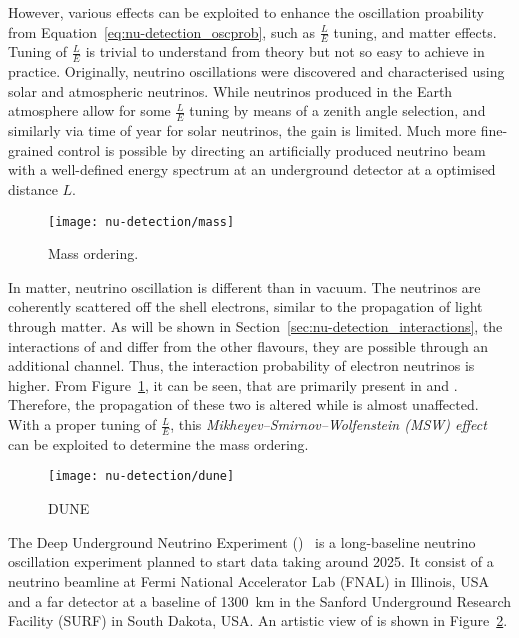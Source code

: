 However, various effects can be exploited to enhance the oscillation proability from Equation~\eqref{eq:nu-detection_oscprob}, such as $\frac{L}{E}$ tuning, and matter effects.
Tuning of $\frac{L}{E}$ is trivial to understand from theory but not so easy to achieve in practice.
Originally, neutrino oscillations were discovered and characterised using solar and atmospheric neutrinos.
While neutrinos produced in the Earth atmosphere allow for some $\frac{L}{E}$ tuning by means of a zenith angle selection, and similarly via time of year for solar neutrinos, the gain is limited.
Much more fine-grained control is possible by directing an artificially produced neutrino beam with a well-defined energy spectrum at an underground detector at a optimised distance $L$.

\begin{figure}[htb]
	\centering
	\texttt{[image: nu-detection/mass]}
	\caption{Mass ordering.~\cite{king}}
	\label{fig:nu-detection_mass}
\end{figure}

In matter, neutrino oscillation is different than in vacuum.
The neutrinos are coherently scattered off the shell electrons, similar to the propagation of light through matter.
As will be shown in Section~\ref{sec:nu-detection_interactions}, the interactions of \Pgne and \Pagne differ from the other flavours, they are possible through an additional channel.
Thus, the interaction probability of electron neutrinos is higher.
From Figure~\ref{fig:nu-detection_mass}, it can be seen, that \Pgne are primarily present in  and .
Therefore, the propagation of these two is altered while  is almost unaffected.
With a proper tuning of $\frac{L}{E}$, this \emph{Mikheyev–Smirnov–Wolfenstein (MSW) effect}~\cite{mikheyevSmirnov, wolfenstein} can be exploited to determine the mass ordering.

\begin{figure}[htb]
	\centering
	\texttt{[image: nu-detection/dune]}
	\caption{DUNE~\cite{dune1}}
	\label{fig:nu-detection_dune}
\end{figure}

The Deep Underground Neutrino Experiment (\dune{})~\cite{dune1, dune2, dune3, dune4} is a long-baseline neutrino oscillation experiment planned to start data taking around 2025.
It consist of a neutrino beamline at Fermi National Accelerator Lab (FNAL) in Illinois, USA and a \lartpc{} far detector at a baseline of \SI{1300}{\kilo\metre} in the Sanford Underground Research Facility (SURF) in South Dakota, USA.
An artistic view of \dune{} is shown in Figure~\ref{fig:nu-detection_dune}.

